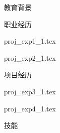 \documentclass{../resume} %
\begin{document}



\begin{rSection}{教育背景}
\item 
\item 
\item 
\item 
\end{rSection}

\begin {rSection}{职业经历}
\item {proj_exp1_1.tex}
\item {proj_exp2_1.tex}
\end{rSection}

\begin {rSection}{项目经历}
\item {proj_exp3_1.tex}
\item {proj_exp4_1.tex}
\end {rSection}

\begin{rSection}{技能}
\item 
\end{rSection}
\end{document}
